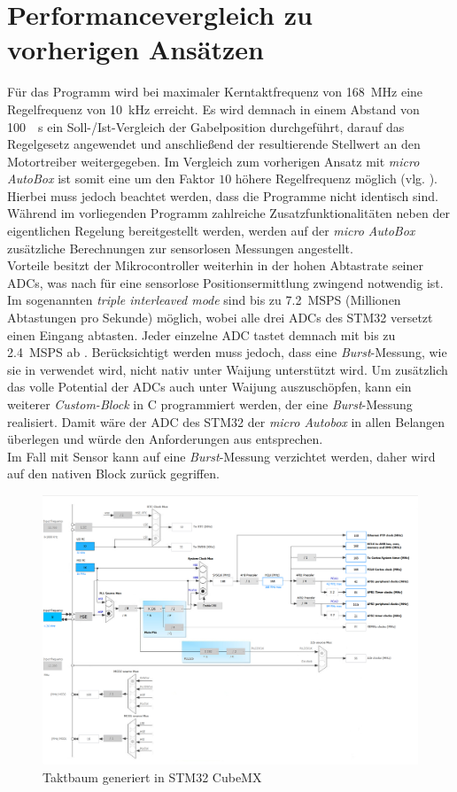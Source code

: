 \section{Performancevergleich zu vorherigen Ansätzen} \label{perfVergl}
Für das Programm wird bei maximaler Kerntaktfrequenz von \SI{168}{MHz} eine Regelfrequenz von \SI{10}{kHz} erreicht. Es wird demnach in einem Abstand von \SI{100}{\mu s} ein Soll-/Ist-Vergleich der Gabelposition durchgeführt, darauf das Regelgesetz angewendet und anschließend der resultierende Stellwert an den Motortreiber weitergegeben. Im Vergleich zum vorherigen Ansatz mit \textit{micro AutoBox} ist somit eine um den Faktor $10$ höhere Regelfrequenz möglich (vlg. \cite{vADP}). Hierbei muss jedoch beachtet werden, dass die Programme nicht identisch sind. Während im vorliegenden Programm zahlreiche Zusatzfunktionalitäten neben der eigentlichen Regelung bereitgestellt werden, werden auf der \textit{micro AutoBox} zusätzliche Berechnungen zur sensorlosen Messungen angestellt. \\
Vorteile besitzt der Mikrocontroller weiterhin in der hohen Abtastrate seiner ADCs, was nach \cite{vADP} für eine sensorlose Positionsermittlung zwingend notwendig ist. Im sogenannten \textit{triple interleaved mode} sind bis zu \SI{7,2}{MSPS} (Millionen Abtastungen pro Sekunde) möglich, wobei alle drei ADCs des STM32 versetzt einen Eingang abtasten. Jeder einzelne ADC tastet demnach mit bis zu \SI{2,4}{MSPS} ab \cite{stm32}. Berücksichtigt werden muss jedoch, dass eine \textit{Burst}-Messung, wie sie in \cite{vADP} verwendet wird, nicht nativ unter Waijung  unterstützt wird. Um zusätzlich das volle Potential der ADCs auch unter Waijung auszuschöpfen, kann ein weiterer \textit{Custom-Block} in C programmiert werden, der eine \textit{Burst}-Messung realisiert. Damit wäre der ADC des STM32 der \textit{micro Autobox} in allen Belangen überlegen und würde den Anforderungen aus \cite{vADP} entsprechen.  \\
Im Fall mit Sensor kann auf eine \textit{Burst}-Messung verzichtet werden, daher wird auf den nativen Block zurück gegriffen.   

\begin{figure}%
\includegraphics[width=\columnwidth]{./Bilder/fig_clock}%
\caption{Taktbaum generiert in STM32 CubeMX}%
\label{fig_clock}%
\end{figure}

